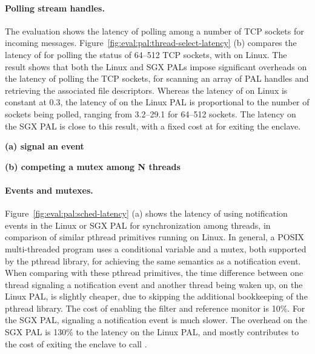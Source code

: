 \paragraph{Polling stream handles.}
The evaluation shows the latency of polling among a number of TCP sockets for incoming messages.
Figure~\ref{fig:eval:pal:thread-select-latency} (b)
compares the latency of
 for polling the status
of 64--512 TCP sockets,
with  on Linux.
The result shows that both the Linux and SGX PALs impose significant overheads on the latency of polling the TCP sockets,
for scanning an array of PAL handles and retrieving the associated file descriptors.
Whereas the latency of  on Linux is constant at \roughly{}0.3\usec{}, the latency of  on the Linux PAL is proportional to the number of sockets being polled,
ranging from 3.2--29.1\usec{} for 64--512 sockets.
The latency on the SGX PAL is close to this result,
with a fixed cost at \usec{} for exiting the enclave.





\begin{figure*}[t!]
\centering
\footnotesize
{}
\parbox{0.49\textwidth}{\centering\bf (a) signal an event}
\parbox{0.49\textwidth}{\centering\bf (b) competing a mutex among N threads}
\caption{Latency of (a) signaling an event and (b) competing a mutex among N threads (N: 1 to 8).
Lower is better.
The comparison is between (1) pthread condition variables and mutexes on Linux; (2) Notification events and mutexes on the Linux PAL, with and without a \seccomp{} filter ({\bf +SC}) and reference monitor ({\bf +RM}); (3) the same abstractions on the SGX PAL.}
\label{fig:eval:pal:sched-latency}
\end{figure*}



\paragraph{Events and mutexes.}
Figure~\ref{fig:eval:pal:sched-latency} (a) shows the latency of using notification events in the Linux or SGX PAL
for synchronization among threads,
in comparison of similar pthread primitives running on Linux.
In general,
a POSIX multi-threaded program
uses a conditional variable and a mutex, both supported by the pthread library, for achieving the same semantics as a notification event.
When comparing with these pthread primitives,
the time difference between one thread signaling a notification event and another thread being waken up,
on the Linux PAL, is slightly cheaper, due to skipping the additional bookkeeping of the pthread library.
The cost of enabling the \seccomp{} filter and reference monitor is \roughly{}10\%.
For the SGX PAL, signaling a notification event is much slower.
The overhead on the SGX PAL
is \roughly{}130\% to the latency
on the Linux PAL,
and mostly contributes to the cost of exiting the enclave to call .


